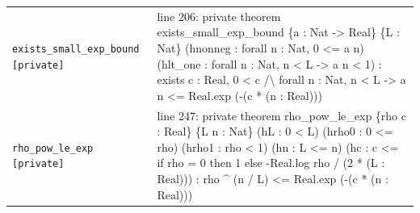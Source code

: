 \documentclass[10pt]{article}
\begin{document}
\begin{longtable}{>{\raggedright\arraybackslash}p{} >{\raggedright\arraybackslash}p{}}
\texttt{exists\_\allowbreak{}small\_\allowbreak{}exp\_\allowbreak{}bound [private]} & {\ttfamily\scriptsize line 206:\allowbreak{} private theorem exists\_\allowbreak{}small\_\allowbreak{}exp\_\allowbreak{}bound \{a :\allowbreak{} Nat -\allowbreak{}> Real\} \{L :\allowbreak{} Nat\} (\allowbreak{}hnonneg :\allowbreak{} forall n :\allowbreak{} Nat,\allowbreak{} 0 <=\allowbreak{} a n)\allowbreak{} (\allowbreak{}hlt\_\allowbreak{}one :\allowbreak{} forall n :\allowbreak{} Nat,\allowbreak{} n < L -\allowbreak{}> a n < 1)\allowbreak{} :\allowbreak{} exists c :\allowbreak{} Real,\allowbreak{} 0 < c /\allowbreak{}\textbackslash{} forall n :\allowbreak{} Nat,\allowbreak{} n < L -\allowbreak{}> a n <=\allowbreak{} Real.\allowbreak{}exp (\allowbreak{}-\allowbreak{}(\allowbreak{}c *\allowbreak{} (\allowbreak{}n :\allowbreak{} Real)\allowbreak{})\allowbreak{})\allowbreak{}} \\[0.45em]
\texttt{rho\_\allowbreak{}pow\_\allowbreak{}le\_\allowbreak{}exp [private]} & {\ttfamily\scriptsize line 247:\allowbreak{} private theorem rho\_\allowbreak{}pow\_\allowbreak{}le\_\allowbreak{}exp \{rho c :\allowbreak{} Real\} \{L n :\allowbreak{} Nat\} (\allowbreak{}hL :\allowbreak{} 0 < L)\allowbreak{} (\allowbreak{}hrho0 :\allowbreak{} 0 <=\allowbreak{} rho)\allowbreak{} (\allowbreak{}hrho1 :\allowbreak{} rho < 1)\allowbreak{} (\allowbreak{}hn :\allowbreak{} L <=\allowbreak{} n)\allowbreak{} (\allowbreak{}hc :\allowbreak{} c <=\allowbreak{} if rho =\allowbreak{} 0 then 1 else -\allowbreak{}Real.\allowbreak{}log rho /\allowbreak{} (\allowbreak{}2 *\allowbreak{} (\allowbreak{}L :\allowbreak{} Real)\allowbreak{})\allowbreak{})\allowbreak{} :\allowbreak{} rho \textasciicircum{} (\allowbreak{}n /\allowbreak{} L)\allowbreak{} <=\allowbreak{} Real.\allowbreak{}exp (\allowbreak{}-\allowbreak{}(\allowbreak{}c *\allowbreak{} (\allowbreak{}n :\allowbreak{} Real)\allowbreak{})\allowbreak{})\allowbreak{}} \\[0.45em]

\end{longtable}
\end{document}
